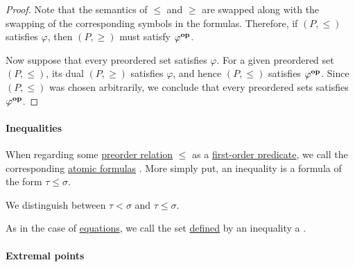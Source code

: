 \begin{proof}
  Note that the semantics of \( \leq \) and \( \geq \) are swapped along with the swapping of the corresponding symbols in the formulas. Therefore, if \( (P, \leq) \) satisfies \( \varphi \), then \( (P, \geq) \) must satisfy \( \varphi^\oppos \).

  Now suppose that every preordered set satisfies \( \varphi \). For a given preordered set \( (P, \leq) \), its dual \( (P, \geq) \) satisfies \( \varphi \), and hence \( (P, \leq) \) satisfies \( \varphi^\oppos \). Since \( (P, \leq) \) was chosen arbitrarily, we conclude that every preordered sets satisfies \( \varphi^\oppos \).
\end{proof}

\paragraph{Inequalities}

\begin{definition}\label{def:inequality}\mimprovised
  When regarding some \hyperref[def:preordered_set]{preorder relation} \( \leq \) as a \hyperref[def:first_order_language/pred]{first-order predicate}, we call the corresponding \hyperref[def:first_order_syntax/atomic_formula]{atomic formulas} . More simply put, an inequality is a formula of the form \( \tau \leq \sigma \).

  We distinguish between  \( \tau < \sigma \) and  \( \tau \leq \sigma \).

  As in the case of \hyperref[def:first_order_equation]{equations}, we call the set \hyperref[def:first_order_definability]{defined} by an inequality a .
\end{definition}

\paragraph{Extremal points}

